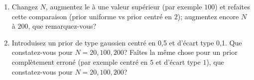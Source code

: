 \documentclass[a4paper]{article}
\begin{document}
\begin{enumerate}
	\item Changez $N$, augmentez le à une valeur supérieur (par exemple $100$) et refaites cette comparaison (prior uniforme vs prior centré en $2$); augmentez encore $N$ à $200$, que remarquez-vous?
	\item Introduisez un prior de type gaussien centré en 0,5 et d'écart type 0,1. Que constatez-vous pour $N=20,100,200$? Faîtes la même chose pour un prior complètement erroné (par exemple centré en $5$ et d'écart type $1$), que constatez-vous pour $N=20,100,200$?
\end{enumerate}
\end{document}
